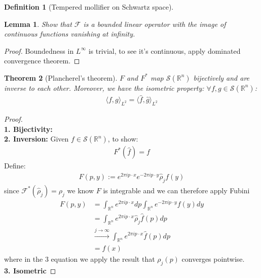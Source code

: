 \documentclass[a4paper,11pt,fleqn]{book}
\newtheorem{theorem}{Theorem}[section]
\newtheorem{lemma}[theorem]{Lemma}
\theoremstyle{definition}
\newtheorem{definition}{Definition}[section]
\theoremstyle{remark}
\begin{document}
\begin{definition}[Tempered mollifier on Schwartz space]
	
\end{definition}

\begin{lemma}
Show that $\mathcal{F}$ is a bounded linear operator with the image of continuous functions vanishing at infinity.	
\end{lemma}
\begin{proof}
	Boundedness in $L^\infty$ is trivial, to see it's continuous, apply dominated convergence theorem.
\end{proof}

\begin{theorem}[Plancherel's theorem]
$F$ and $F^*$ map $\mathcal{S}(\mathbb{R}^n)$ bijectively and are inverse to each other. Moreover, we have the isometric property: 
	$\forall f, g \in \mathcal{S}(\mathbb{R}^n)$:
	\begin{align*}
		\langle f, g \rangle_{L^2} = \langle \hat{f}, \hat{g} \rangle_{L^2}
	\end{align*}
\end{theorem}
\begin{proof}\quad\\
\textbf{1. Bijectivity:}    \\
\textbf{2. Inversion:} Given $f \in \mathcal{S}(\mathbb{R}^n)$, to show:
\begin{align*}
	 F^*(\hat{f}) = f
\end{align*}
Define:
\begin{align*}
	F(p, y):= e^{2\pi i p\cdot x} e^{-2\pi i p \cdot y} \hat{\rho}_j f(y)
\end{align*}
since $\mathcal{F}^*(\hat{\rho}_j) =\rho_j$ we know $F$ is integrable and we can therefore apply Fubini
\begin{align*}
	F(p, y) &= \int_{\mathbb{R}^n} e^{2\pi i p \cdot x} dp \int_{\mathbb{R}^n} e^{-2\pi i p \cdot y} f(y)dy\\
	&= \int_{\mathbb{R}^n} e^{2\pi i p \cdot x} \hat{\rho}_j \hat{f}(p) dp\\
	&\overset{j \rightarrow \infty}{\longrightarrow}
	\int_{\mathbb{R}^n} e^{2\pi i p \cdot x} \hat{f}(p) dp\\
	&= f(x)
\end{align*}
where in the 3 equation we apply the result that $\rho_j(p)$ converges pointwise.\\
\textbf{3. Isometric}
\end{proof}
\end{document}
